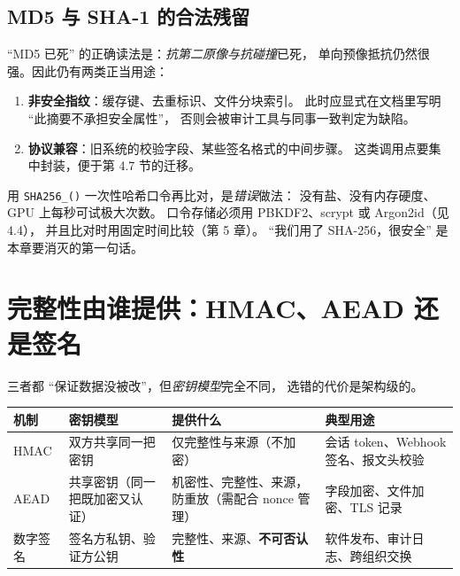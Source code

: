 \documentclass[12pt,a4paper,fontset=fandol]{ctexbook}
\newcommand{\Fn}[1]{\texttt{#1()}}
\begin{document}
\subsection{MD5 与 SHA-1 的合法残留}

``MD5 已死'' 的正确读法是：\emph{抗第二原像与抗碰撞}已死，
单向预像抵抗仍然很强。因此仍有两类正当用途：

\begin{enumerate}
  \item \textbf{非安全指纹}：缓存键、去重标识、文件分块索引。
        此时应显式在文档里写明 ``此摘要不承担安全属性''，
        否则会被审计工具与同事一致判定为缺陷。
  \item \textbf{协议兼容}：旧系统的校验字段、某些签名格式的中间步骤。
        这类调用点要集中封装，便于第 4.7 节的迁移。
\end{enumerate}

\begin{warning}[title=把摘要当口令存储]
用 \Fn{SHA256\_} 一次性哈希口令再比对，是\emph{错误}做法：
没有盐、没有内存硬度、GPU 上每秒可试极大次数。
口令存储必须用 PBKDF2、scrypt 或 Argon2id（见 4.4），
并且比对时用固定时间比较（第 5 章）。
``我们用了 SHA-256，很安全'' 是本章要消灭的第一句话。
\end{warning}

\section{完整性由谁提供：HMAC、AEAD 还是签名}

三者都 ``保证数据没被改''，但\emph{密钥模型}完全不同，
选错的代价是架构级的。

\begin{footnotesize}
\begin{longtable}{@{}>{\raggedright\arraybackslash}p{}
                  >{\raggedright\arraybackslash}p{}
                  >{\raggedright\arraybackslash}p{}
                  >{\raggedright\arraybackslash}p{}@{}}
\toprule
\textbf{机制} & \textbf{密钥模型} & \textbf{提供什么} & \textbf{典型用途} \\
\midrule
HMAC & 双方共享同一把密钥 &
仅完整性与来源（不加密） &
会话 token、Webhook 签名、报文头校验 \\
\addlinespace
AEAD & 共享密钥（同一把既加密又认证） &
机密性、完整性、来源，防重放（需配合 nonce 管理） &
字段加密、文件加密、TLS 记录 \\
\addlinespace
数字签名 & 签名方私钥、验证方公钥 &
完整性、来源、\textbf{不可否认性} &
软件发布、审计日志、跨组织交换 \\
\bottomrule
\end{longtable}
\end{footnotesize}
\end{document}
